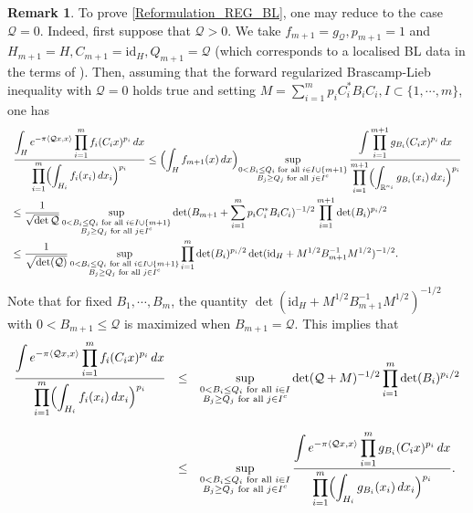\documentclass[11pt,a4paper,reqno]{amsart}
\numberwithin{equation}{section}
\theoremstyle{definition}
\newtheorem{remark}[theorem]{Remark}
\newcommand{\nm}{\noalign{\smallskip}}
\newcommand{\ds}{\displaystyle}
\newcommand{\<}{\ensuremath \leq}
\renewcommand{\>}{\ensuremath \geq}
\begin{document}
\begin{remark}
To prove \cref{Reformulation_REG_BL}, one may reduce to the case $\mathcal{Q}=0$. 
Indeed, first suppose that $\mathcal{Q}>0.$ We take $f_{m+1}=g_{\mathcal Q}, p_{m+1}=1$ and $H_{m+1}=H, C_{m+1}=\mathrm{id}_{H}, Q_{m+1}=\mathcal Q$ (which corresponds to a localised BL data in the terms of \cite{BCCT}). Then, assuming that the forward regularized Brascamp-Lieb inequality with $\mathcal Q=0$ holds true and setting $\ds M=\sum_{i=1}^m p_iC_i^*B_iC_i, I \subset \{1,\cdots,m\}$, one has $$\begin{array}{lll} \ds \frac{\ds \int_H e^{-\pi \langle \mathcal Qx,x\rangle}\prod_{i=1}^m f_i(C_ix)^{p_i}\, dx}{\ds \prod_{i=1}^m \Bigl(\int_{H_i}f_i(x_i) \, dx_i \Bigl)^{p_i}}
\leq \ds \Bigl(\int_{H} f_{m+1}(x) \, dx \Bigl) \sup_{\substack{0<B_i \leq Q_i \text{ for all } i \in I \cup \{m+1\} \\  B_{j} \geq Q_j \text{ for all } j \in I^c}}\frac{\ds \int \prod_{i=1}^{m+1} g_{B_i}(C_ix)^{p_i}\, dx}{\ds \prod_{i=1}^{m+1} \Bigl(\int_{\mathbb{R}^{n_i}}g_{B_i}(x_i) \, dx_i \Bigl)^{p_i}} \\
\nm
\leq \ds \frac{1}{\sqrt{\det\mathcal Q}} \sup_{\substack{0<B_i \leq Q_i \text{ for all } i \in I \cup \{m+1\} \\  B_{j} \geq Q_j \text{ for all } j \in I^c}} \det(B_{m+1}+\sum_{i=1}^m p_iC_i^*B_iC_i)^{-1/2} \ds \prod_{i=1}^{m+1}\det(B_i)^{p_i/2} \\
\nm 
\leq \ds  \frac{1}{\sqrt{\det(\mathcal Q)}}  \sup_{\substack{0<B_i \leq Q_i \text{ for all } i \in I \cup \{m+1\} \\  B_{j} \geq Q_j \text{ for all } j \in I^c}}  \prod_{i=1}^{m} \det(B_i)^{p_i/2} \det(\mathrm{id}_H+M^{1/2}B_{m+1}^{-1}M^{1/2})^{-1/2}.
\end{array}$$
Note that for fixed $B_1,\cdots,B_m$, the quantity $\det(\mathrm{id}_H+M^{1/2}B_{m+1}^{-1}M^{1/2})^{-1/2}$ with $0<B_{m+1} \leq \mathcal Q$ is maximized when $B_{m+1}=\mathcal Q.$ This implies that $$\begin{array}{lll}\ds \frac{\ds \int e^{-\pi \langle \mathcal Qx,x\rangle}\prod_{i=1}^m f_i(C_ix)^{p_i}\, dx}{\ds \prod_{i=1}^m \Bigl(\int_{H_i}f_i(x_i) \, dx_i \Bigl)^{p_i}} &\leq& \ds  \sup_{\substack{0<B_i \leq Q_i \text{ for all } i \in I \\  B_{j} \geq Q_j \text{ for all } j \in I^c}} \det(\mathcal Q+M)^{-1/2}   \prod_{i=1}^m \det(B_i)^{p_i/2} \\ \\
&\leq& \ds  \sup_{\substack{0<B_i \leq Q_i \text{ for all } i \in I \\  B_{j} \geq Q_j \text{ for all } j \in I^c}}\frac{\ds \int e^{-\pi \langle \mathcal Qx,x\rangle}\prod_{i=1}^m g_{B_i}(C_ix)^{p_i}\, dx}{\ds \prod_{i=1}^m \Bigl(\int_{H_i}g_{B_i}(x_i) \, dx_i \Bigl)^{p_i}}.

\end{array}$$
\end{remark}
\end{document}
